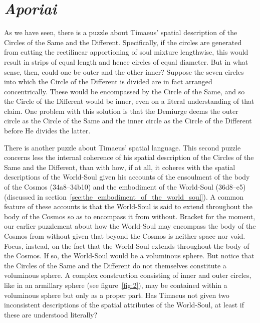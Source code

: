 
\section{\emph{Aporiai}} %
\label{sec:aporiai}

As we have seen, there is a puzzle about Timaeus' spatial description of the Circles of the Same and the Different. Specifically, if the circles are generated from cutting the rectilinear apportioning of soul mixture lengthwise, this would result in strips of equal length and hence circles of equal diameter. But in what sense, then, could one be outer and the other inner? Suppose the seven circles into which the Circle of the Different is divided are in fact arranged concentrically. These would be encompassed by the Circle of the Same, and so the Circle of the Different would be inner, even on a literal understanding of that claim. One problem with this solution is that the Demiurge deems the outer circle as the Circle of the Same and the inner circle as the Circle of the Different before He divides the latter.

There is another puzzle about Timaeus' spatial language. This second puzzle concerns less the internal coherence of his spatial description of the Circles of the Same and the Different, than with how, if at all, it coheres with the spatial descriptions of the World-Soul given his accounts of the ensoulment of the body of the Cosmos (34a8--34b10) and the embodiment of the World-Soul (36d8--e5) (discussed in section~\ref{sec:the_embodiment_of_the_world_soul}). A common feature of these accounts is that the World-Soul is said to extend throughout the body of the Cosmos so as to encompass it from without. Bracket for the moment, our earlier puzzlement about how the World-Soul may encompass the body of the Cosmos from without given that beyond the Cosmos is neither space nor void. Focus, instead, on the fact that the World-Soul extends throughout the body of the Cosmos. If so, the World-Soul would be a voluminous sphere. But notice that the Circles of the Same and the Different do not themselves constitute a voluminous sphere. A complex construction consisting of inner and outer circles, like in an armillary sphere (see figure~\ref{fig:2}), may be contained within a voluminous sphere but only as a proper part. Has Timaeus not given two inconsistent descriptions of the spatial attributes of the World-Soul, at least if these are understood literally?

